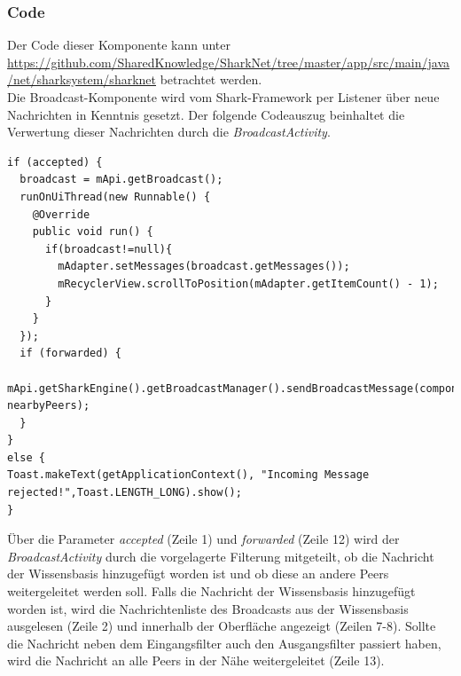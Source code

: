 \subsubsection{Code}
Der Code dieser Komponente kann unter \url{https://github.com/SharedKnowledge/SharkNet/tree/master/app/src/main/java/net/sharksystem/sharknet} betrachtet werden. 
\\Die Broadcast-Komponente wird vom Shark-Framework per Listener über neue Nachrichten in Kenntnis gesetzt. Der folgende Codeauszug beinhaltet die Verwertung dieser Nachrichten durch die \textit{BroadcastActivity}. \newline
 \lstset{language=Java, caption=Anzeige und Weiterleitungen von Nachrichten (Auszug), label=DescriptiveLabel, numbers=left, numbersep=1em, breaklines=true, basicstyle=\small}
\begin{lstlisting}
if (accepted) {
  broadcast = mApi.getBroadcast();
  runOnUiThread(new Runnable() {
    @Override
    public void run() {
      if(broadcast!=null){
        mAdapter.setMessages(broadcast.getMessages());
        mRecyclerView.scrollToPosition(mAdapter.getItemCount() - 1);
      }
    }
  });
  if (forwarded) {
    mApi.getSharkEngine().getBroadcastManager().sendBroadcastMessage(component, nearbyPeers);
  }
}
else {
Toast.makeText(getApplicationContext(), "Incoming Message rejected!",Toast.LENGTH_LONG).show();
}
\end{lstlisting}
Über die Parameter \textit{accepted} (Zeile 1) und \textit{forwarded} (Zeile 12) wird der \textit{BroadcastActivity} durch die vorgelagerte Filterung mitgeteilt, ob die Nachricht der Wissensbasis hinzugefügt worden ist und ob diese an andere Peers weitergeleitet werden soll. Falls die Nachricht der Wissensbasis hinzugefügt worden ist, wird die Nachrichtenliste des Broadcasts aus der Wissensbasis ausgelesen (Zeile 2) und innerhalb der Oberfläche angezeigt (Zeilen 7-8). Sollte die Nachricht neben dem Eingangsfilter auch den Ausgangsfilter passiert haben, wird die Nachricht an alle Peers in der Nähe weitergeleitet (Zeile 13). 

